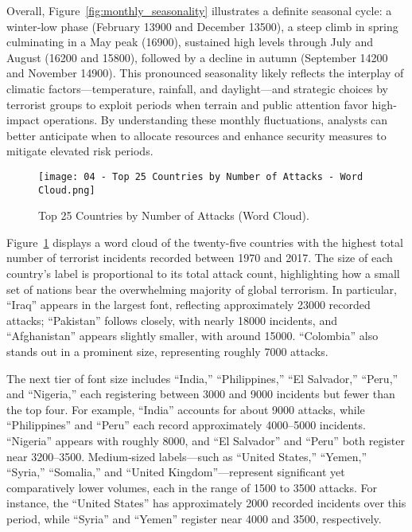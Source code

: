 Overall, Figure~\ref{fig:monthly_seasonality} illustrates a definite seasonal cycle: a winter‐low phase (February 13900 and December 13500), a steep climb in spring culminating in a May peak (16900), sustained high levels through July and August (16200 and 15800), followed by a decline in autumn (September 14200 and November 14900). This pronounced seasonality likely reflects the interplay of climatic factors—temperature, rainfall, and daylight—and strategic choices by terrorist groups to exploit periods when terrain and public attention favor high‐impact operations. By understanding these monthly fluctuations, analysts can better anticipate when to allocate resources and enhance security measures to mitigate elevated risk periods.  



\vspace{0.5em}
\begin{figure}[ht]
  \centering
  \texttt{[image: 04 - Top 25 Countries by Number of Attacks - Word Cloud.png]}
  \caption{Top 25 Countries by Number of Attacks (Word Cloud).}
  \label{fig:wordcloud_countries}
\end{figure}

Figure~\ref{fig:wordcloud_countries} displays a word cloud of the twenty-five countries with the highest total number of terrorist incidents recorded between 1970 and 2017. The size of each country’s label is proportional to its total attack count, highlighting how a small set of nations bear the overwhelming majority of global terrorism. In particular, “Iraq” appears in the largest font, reflecting approximately 23000 recorded attacks; “Pakistan” follows closely, with nearly 18000 incidents, and “Afghanistan” appears slightly smaller, with around 15000. “Colombia” also stands out in a prominent size, representing roughly 7000 attacks.  

The next tier of font size includes “India,” “Philippines,” “El Salvador,” “Peru,” and “Nigeria,” each registering between 3000 and 9000 incidents but fewer than the top four. For example, “India” accounts for about 9000 attacks, while “Philippines” and “Peru” each record approximately 4000–5000 incidents. “Nigeria” appears with roughly 8000, and “El Salvador” and “Peru” both register near 3200–3500. Medium‐sized labels—such as “United States,” “Yemen,” “Syria,” “Somalia,” and “United Kingdom”—represent significant yet comparatively lower volumes, each in the range of 1500 to 3500 attacks. For instance, the “United States” has approximately 2000 recorded incidents over this period, while “Syria” and “Yemen” register near 4000 and 3500, respectively.  

